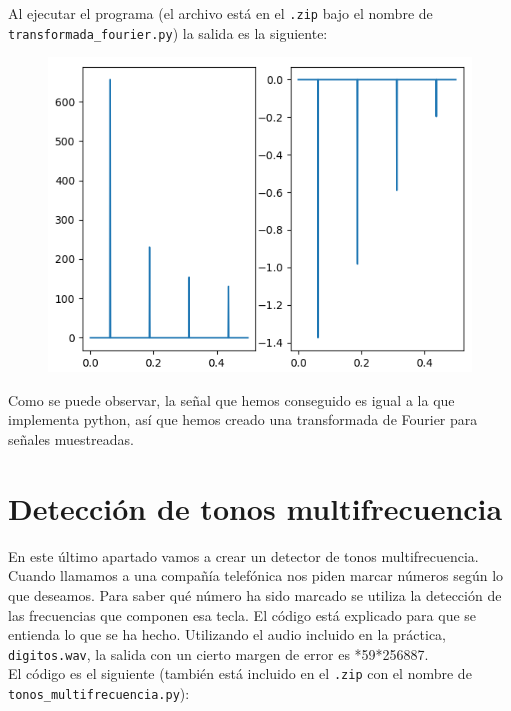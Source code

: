 \documentclass[11pt,a4paper]{article}
\begin{document}
Al ejecutar el programa (el archivo está en el \texttt{.zip} bajo el nombre de \texttt{transformada\_fourier.py})
la salida es la siguiente:

\begin{figure}[H]
	\centering
	\includegraphics[scale=0.55]{img/mi_fft.png}
\end{figure}

Como se puede observar, la señal que hemos conseguido es igual a la que implementa python, así que hemos creado una transformada de Fourier para señales muestreadas.

\newpage

\section{Detección de tonos multifrecuencia}

En este último apartado vamos a crear un detector de tonos multifrecuencia.\\

Cuando llamamos a una compañía telefónica nos piden marcar números según lo que deseamos. Para saber qué número ha sido marcado se utiliza la detección de las frecuencias que componen esa tecla.
El código está explicado para que se entienda lo que se ha hecho. Utilizando el audio incluido en la práctica, \texttt{digitos.wav}, la salida con un cierto margen de error es *59*256887.\\

El código es el siguiente (también está incluido en el \texttt{.zip} con el nombre de\\ \texttt{tonos\_multifrecuencia.py}):
\end{document}
